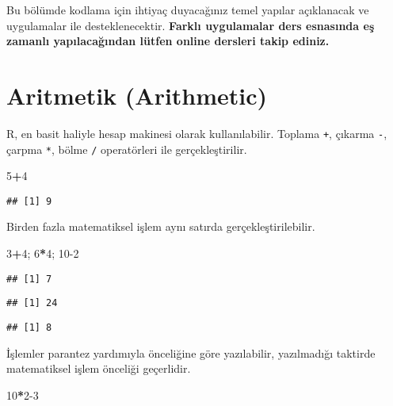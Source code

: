 \documentclass[
]{book}
\newenvironment{Shaded}{\begin{snugshade}}{\end{snugshade}}
\newcommand{\DecValTok}[1]{\textcolor[rgb]{0.00,0.00,0.81}{#1}}
\newcommand{\NormalTok}[1]{#1}
\newcommand{\OperatorTok}[1]{\textcolor[rgb]{0.81,0.36,0.00}{\textbf{#1}}}
\begin{document}
Bu bölümde kodlama için ihtiyaç duyacağınız temel yapılar açıklanacak ve uygulamalar ile desteklenecektir. \textbf{Farklı uygulamalar ders esnasında eş zamanlı yapılacağından lütfen online dersleri takip ediniz.}

\hypertarget{aritmetik-arithmetic}{%
\section{Aritmetik (Arithmetic)}\label{aritmetik-arithmetic}}

R, en basit haliyle hesap makinesi olarak kullanılabilir. Toplama \texttt{+}, çıkarma \texttt{-}, çarpma \texttt{*}, bölme \texttt{/} operatörleri ile gerçekleştirilir.

\begin{Shaded}
\begin{Highlighting}[]
\DecValTok{5}\OperatorTok{+}\DecValTok{4}
\end{Highlighting}
\end{Shaded}

\begin{verbatim}
## [1] 9
\end{verbatim}

Birden fazla matematiksel işlem aynı satırda gerçekleştirilebilir.

\begin{Shaded}
\begin{Highlighting}[]
\DecValTok{3}\OperatorTok{+}\DecValTok{4}\NormalTok{; }\DecValTok{6}\OperatorTok{*}\DecValTok{4}\NormalTok{; }\DecValTok{10-2}
\end{Highlighting}
\end{Shaded}

\begin{verbatim}
## [1] 7
\end{verbatim}

\begin{verbatim}
## [1] 24
\end{verbatim}

\begin{verbatim}
## [1] 8
\end{verbatim}

İşlemler parantez yardımıyla önceliğine göre yazılabilir, yazılmadığı taktirde matematiksel işlem önceliği geçerlidir.

\begin{Shaded}
\begin{Highlighting}[]
\DecValTok{10}\OperatorTok{*}\DecValTok{2-3}
\end{Highlighting}
\end{Shaded}
\end{document}
